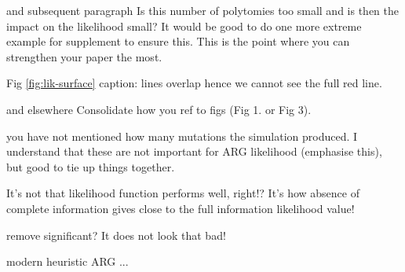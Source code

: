 \reply{
}

\begin{point}{\revref{} and subsequent paragraph} %
 Is this number of polytomies too small and is then the impact on the likelihood small? It would be good to do one more extreme example for supplement to ensure this. This is the point where you can strengthen your paper the most.
\end{point}

\reply{
}

\begin{point}{Fig \ref{fig:lik-surface} caption:}
 lines overlap hence we cannot see the full red line.
\end{point}

\reply{
}

\begin{point}{\revref{} and elsewhere} %
 Consolidate how you ref to figs (Fig 1. or Fig 3).
\end{point}


\begin{point}{\revref} %
 you have not mentioned how many mutations the simulation produced. I understand that these are not important for ARG likelihood (emphasise this), but good to tie up things together.
\end{point}

\reply{
}

\begin{point}{\revref} %
 It's not that likelihood function performs well, right!? It's how absence of complete information gives close to the full information likelihood value!
\end{point}

\reply{
}

\begin{point}{\revref} %
 remove significant? It does not look that bad!
\end{point}



\begin{point}{\revref} %
 modern heuristic ARG ...
\end{point}


